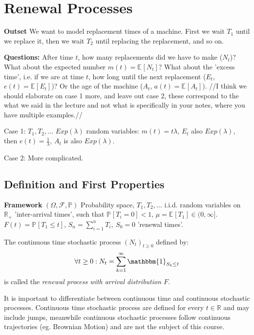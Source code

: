 \chapter{Renewal Processes}
\textbf{Outset} We want to model replacement times of a machine. First we wait $T_1$ until we replace it, then we wait $T_2$ until replacing the replacement, and so on.

\noindent
\textbf{Questions:} After time $t$, how many replacements did we have to make ($N_t$)? What about the expected number $m(t)=\mathbb{E}_{} \left[ N_t \right] $?
What about the 'excess time', i.e. if we are at time $t$, how long until the next replacement ($E_t$, $e(t)=\mathbb{E}_{} \left[ E_t \right]$)? Or the age of the machine ($A_t$, $a(t)=\mathbb{E}_{} \left[ A_t \right] $).
{\color{blue} //I think we should elaborate on case 1 more, and leave out case 2, these correspond to the what we said in the lecture and not what is specifically in your notes, where you have multiple examples.//}

Case 1: $T_1, T_2, \ldots$  $Exp(\lambda)$ random variables: $m(t)=t\lambda$, $E_t$ also $Exp(\lambda)$, then $e(t)= \frac{1}{\lambda}$, $A_t$ is also $Exp(\lambda)$.

Case 2: More complicated.

\section{Definition and First Properties}
\textbf{Framework} $(\Omega, \mathcal{F}, \mathbb{P})$ Probability space, $T_1, T_2, \ldots $  i.i.d. random variables on $\mathbb{R}_+$ 'inter-arrival times', such that $\mathbb{P}_{} \left[ T_i = 0 \right] < 1$, $\mu = \mathbb{E}_{} \left[ T_1 \right] \in (0, \infty]$. $F(t) =  \mathbb{P}_{} \left[ T_1 \leq t \right] $, $S_n = \sum_{i=1}^{n} T_i,\ S_0 =0$ 'renewal times'.
\begin{defn}
	The continuous time stochastic process $(N_t)_{t\geq 0}$ defined by:
\begin{align}
	\forall t \geq 0: N_t = \sum_{k=1}^{\infty} \mathbbm{1}_{S_k \leq t}
\end{align}
is called the \emph{renewal process with arrival distribution $F$}.
\end{defn}
{\color{blue}
\begin{rmk}[]
	It is important to differentiate between continuous time and continuous stochastic processes. Continuous time stochastic process are defined for every $t \in \mathbb{R}$ and may include jumps, meanwhile continuous stochastic processes follow continuous trajectories (eg.  Brownian Motion) and are not the subject of this course.
\end{rmk}
}

